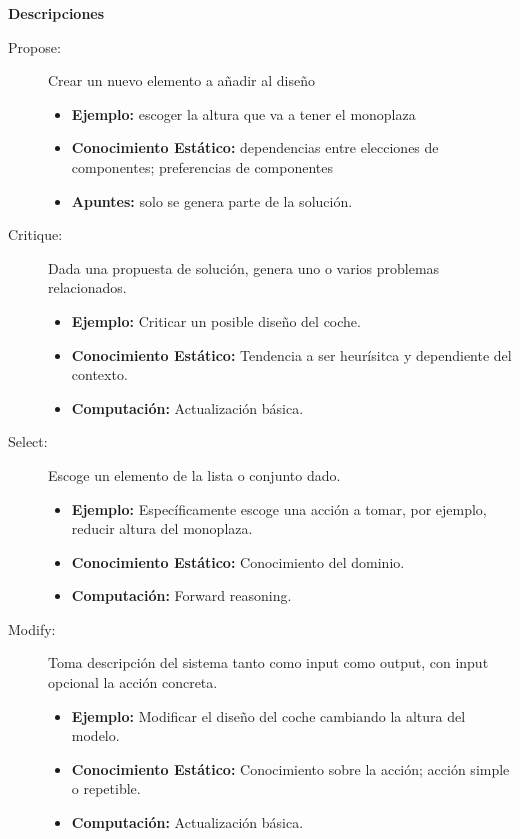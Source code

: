 \documentclass[12pt,a4paper,twoside,spanish]{article}      %
\begin{document}
\textbf{Descripciones}
\begin{description}
    \item [Propose:] Crear un nuevo elemento a añadir al diseño
        \hspace*{2cm}
        \begin{itemize}
            \item \textbf {Ejemplo:} escoger la altura que va a tener el monoplaza
            \item \textbf {Conocimiento Estático:} dependencias entre elecciones de componentes; preferencias de componentes
            \item \textbf {Apuntes:} solo se genera parte de la solución.
        \end{itemize}
    \item [Critique:] Dada una propuesta de solución, genera uno o varios problemas relacionados.
       \begin{itemize}
            \item \textbf {Ejemplo:} Criticar un posible diseño del coche.
            \item \textbf {Conocimiento Estático:} Tendencia a ser heurísitca y dependiente del contexto.
            \item \textbf {Computación:} Actualización básica.
        \end{itemize}
    \item [Select:] Escoge un elemento de la lista o conjunto dado.
        \begin{itemize}
            \item \textbf {Ejemplo:} Específicamente escoge una acción a tomar, por ejemplo, reducir altura del monoplaza.
            \item \textbf {Conocimiento Estático:} Conocimiento del dominio.
            \item \textbf {Computación:} Forward reasoning.
        \end{itemize}
    \item [Modify:] Toma descripción del sistema tanto como input como output, con input opcional la acción concreta.
        \begin{itemize}
            \item \textbf {Ejemplo:} Modificar el diseño del coche cambiando la altura del modelo.
            \item \textbf {Conocimiento Estático:} Conocimiento sobre la acción; acción simple o repetible.
            \item \textbf {Computación:} Actualización básica.

\end{itemize}
\end{description}
\end{document}
